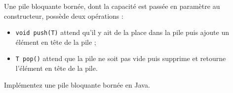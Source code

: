
\begingroup

\begin{exercice}
  \label{exo:monitors/stack}

  Une pile bloquante bornée, dont la capacité est passée en paramètre au constructeur, possède deux opérations :

  \begin{itemize}
  \item \lstinline{void push(T)} attend qu'il y ait de la place dans la pile puis ajoute un élément en tête de la pile ;
  \item \lstinline{T pop()} attend que la pile ne soit pas vide puis supprime et retourne l'élément en tête de la pile.
  \end{itemize}

  Implémentez une pile bloquante bornée en Java.

\end{exercice}

\endgroup
\endinput


